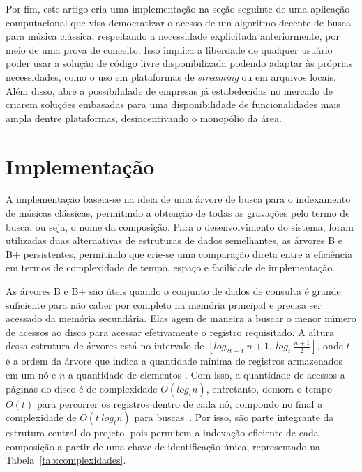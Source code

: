 \documentclass[12pt]{article}
\begin{document}
Por fim, este artigo cria uma implementação na seção seguinte de uma aplicação
computacional que visa democratizar o acesso de um algoritmo decente de busca
para música clássica, respeitando a necessidade explicitada anteriormente, por
meio de uma prova de conceito. Isso implica a liberdade de qualquer usuário
poder usar a solução de código livre disponibilizada podendo adaptar às próprias
necessidades, como o uso em plataformas de \emph{streaming} ou em arquivos
locais. Além disso, abre a possibilidade de empresas já estabelecidas no mercado
de criarem soluções embasadas para uma disponibilidade de funcionalidades mais
ampla dentre plataformas, desincentivando o monopólio da área.

\section{Implementação}

A implementação baseia-se na ideia de uma árvore de busca para o indexamento de
músicas clássicas, permitindo a obtenção de todas as gravações pelo termo de
busca, ou seja, o nome da composição. Para o desenvolvimento do sistema, foram
utilizadas duas alternativas de estruturas de dados semelhantes, as árvores B e
B\nolinebreak+ persistentes, permitindo que crie-se uma comparação direta entre
a eficiência em termos de complexidade de tempo, espaço e facilidade de
implementação.

As árvores B e B\nolinebreak+ são úteis quando o conjunto de dados de consulta é
grande suficiente para não caber por completo na memória principal e precisa ser
acessado da memória secundária. Elas agem de maneira a buscar o menor número de
acessos ao disco para acessar efetivamente o registro requisitado. A altura
dessa estrutura de árvores está no intervalo de $[log_{2t-1}\ n+1,\ log_t\
\frac{n + 1}{2}]$, onde $t$ é a ordem da árvore que indica a quantidade mínima
de registros armazenados em um nó e $n$ a quantidade de elementos
\cite{clrs:22}. Com isso, a quantidade de acessos a páginas do disco é de
complexidade $O(log_t n)$, entretanto, demora o tempo $O(t)$ para percorrer os
registros dentro de cada nó, compondo no final a complexidade de $O(t\ log_t n)$
para buscas~\cite{clrs:22,kpm:10}. Por isso, são parte integrante da estrutura
central do projeto, pois permitem a indexação eficiente de cada composição a
partir de uma chave de identificação única, representado na
Tabela~\ref{tab:complexidades}.
\end{document}
